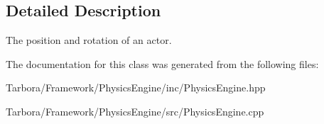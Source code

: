 \subsection{Detailed Description}
The position and rotation of an actor. 

The documentation for this class was generated from the following files\+:\begin{DoxyCompactItemize}
\item 
Tarbora/\+Framework/\+Physics\+Engine/inc/Physics\+Engine.\+hpp\item 
Tarbora/\+Framework/\+Physics\+Engine/src/Physics\+Engine.\+cpp\end{DoxyCompactItemize}
